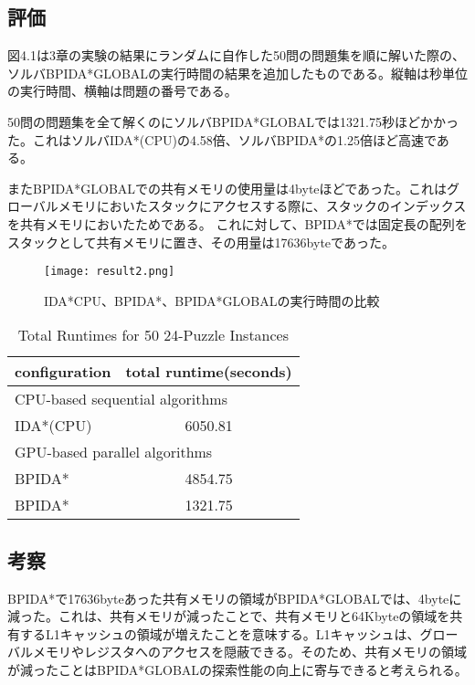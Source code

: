 \documentclass[a4paper,11pt,oneside,openany]{jsbook}
\begin{document}
\subsection{評価}
図4.1は3章の実験の結果にランダムに自作した50問の問題集を順に解いた際の、ソルバBPIDA*GLOBALの実行時間の結果を追加したものである。縦軸は秒単位の実行時間、横軸は問題の番号である。

50問の問題集を全て解くのにソルバBPIDA*GLOBALでは1321.75秒ほどかかった。これはソルバIDA*(CPU)の4.58倍、ソルバBPIDA*の1.25倍ほど高速である。

またBPIDA*GLOBALでの共有メモリの使用量は4byteほどであった。これはグローバルメモリにおいたスタックにアクセスする際に、スタックのインデックスを共有メモリにおいたためである。
これに対して、BPIDA*では固定長の配列をスタックとして共有メモリに置き、その用量は17636byteであった。

\begin{figure}[hbtp]
\begin{center}
\texttt{[image: result2.png]}
\caption{IDA*CPU、BPIDA*、BPIDA*GLOBALの実行時間の比較}
\end{center}
\end{figure}

\begin{table}[hbtp]
\centering
\caption{Total Runtimes for 50 24-Puzzle Instances}
\label{my-label}
\begin{tabular}{|l|c|}
\hline
configuration & \multicolumn{1}{l|}{total runtime(seconds)} \\ \hline
\multicolumn{2}{|l|}{CPU-based sequential algorithms} \\ \hline
IDA*(CPU) & 6050.81 \\ \hline
\multicolumn{2}{|l|}{GPU-based parallel algorithms} \\ \hline
BPIDA* & 4854.75 \\
BPIDA* & 1321.75 \\  \hline
\end{tabular}
\end{table}


\subsection{考察}
BPIDA*で17636byteあった共有メモリの領域がBPIDA*GLOBALでは、4byteに減った。これは、共有メモリが減ったことで、共有メモリと64Kbyteの領域を共有するL1キャッシュの領域が増えたことを意味する。L1キャッシュは、グローバルメモリやレジスタへのアクセスを隠蔽できる。そのため、共有メモリの領域が減ったことはBPIDA*GLOBALの探索性能の向上に寄与できると考えられる。
\end{document}
